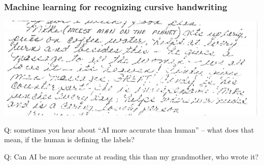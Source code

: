 \documentclass{beamer}
\begin{document}
\begin{frame}
  \frametitle{Machine learning for recognizing cursive handwriting}

\includegraphics[width=1\textwidth]{grandma-handwriting/grand-canyon-page7}

Q: sometimes you hear about ``AI more accurate than human'' -- what
does that mean, if the human is defining the labels? 

Q: Can AI be more accurate at reading this than my grandmother, who
wrote it?

\end{frame}
\end{document}
